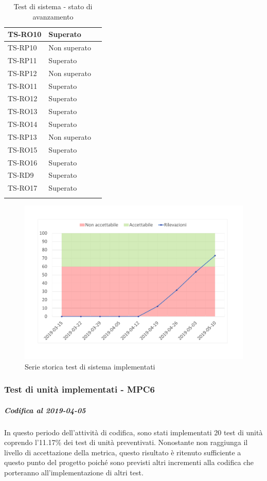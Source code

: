 \begin{longtable}{|>{\centering\arraybackslash}m{1.6cm}|>{\centering\arraybackslash}m{6.41cm}|>{\centering\arraybackslash}m{3.1cm}|}
		\rowcolor{LightGray}
		TS-RO10
		& Superato
		\\ \hline
		TS-RP10		
		& Non superato
		\\ \hline
		\rowcolor{LightGray}
		TS-RP11		
		& Superato
		\\ \hline
		TS-RP12		
		& Non superato
		\\ \hline	
		\rowcolor{LightGray}
		TS-RO11	
		& Superato
		\\ \hline
		TS-RO12	
		& Superato
		\\ \hline
		\rowcolor{LightGray}
		TS-RO13
		& Superato
		\\ \hline
		TS-RO14
		& Superato
		\\ \hline
		\rowcolor{LightGray}
		TS-RP13
		& Non superato
		\\ \hline
		TS-RO15
		& Superato
		\\ \hline
		\rowcolor{LightGray}
		TS-RO16	
		& Superato
		\\ \hline
		TS-RD9
		& Superato
		\\ \hline
		\rowcolor{LightGray}
		TS-RO17
		& Superato
		\\ \hline
		
		\caption{Test di sistema - stato di avanzamento}
\end{longtable}

\begin{figure}[H]
	\centering
	\includegraphics[scale=0.6]{images/resoconto/MPC5Chart.pdf}
	\caption{Serie storica test di sistema implementati}	
\end{figure}
\subsubsection{Test di unità implementati - MPC6}
\subparagraph{Codifica al 2019-04-05}
In questo periodo dell'attività di codifica, sono stati implementati 20 test di unità coprendo l'11.17\% dei test di unità preventivati.
Nonostante non raggiunga il livello di accettazione della
metrica, questo risultato è ritenuto sufficiente a questo punto del progetto poiché sono previsti altri incrementi alla codifica che porteranno all'implementazione di altri test.

